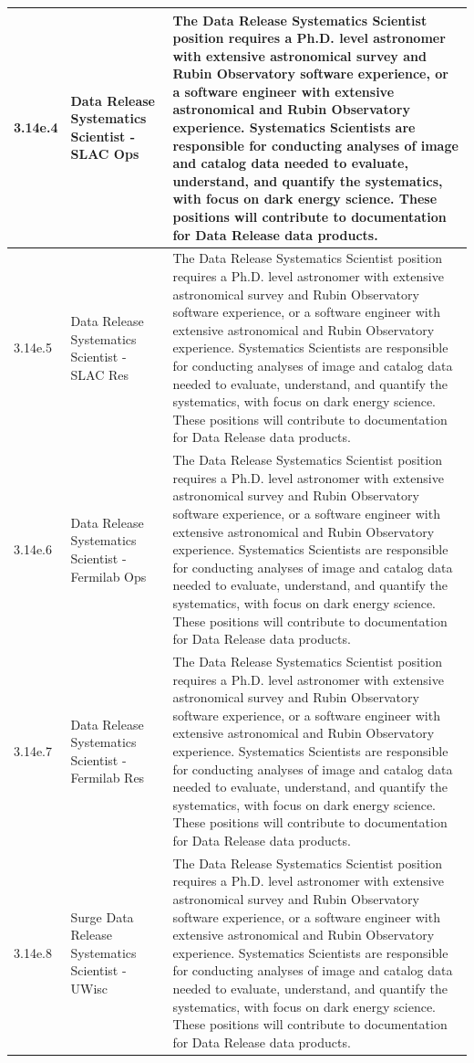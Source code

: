 \begin{longtable} {|p{}|p{}|p{}|}
{3.14e.4}&{Data Release Systematics Scientist - SLAC Ops}&{The Data Release Systematics Scientist position requires a Ph.D. level astronomer with extensive astronomical survey and Rubin Observatory software experience, or a software engineer with extensive astronomical and Rubin Observatory experience. Systematics Scientists are responsible for conducting analyses of image and catalog data needed to evaluate, understand, and quantify the systematics, with focus on dark energy science. These positions will contribute to documentation for Data Release data products. } \\ \hline
{3.14e.5}&{Data Release Systematics Scientist - SLAC Res}&{The Data Release Systematics Scientist position requires a Ph.D. level astronomer with extensive astronomical survey and Rubin Observatory software experience, or a software engineer with extensive astronomical and Rubin Observatory experience. Systematics Scientists are responsible for conducting analyses of image and catalog data needed to evaluate, understand, and quantify the systematics, with focus on dark energy science. These positions will contribute to documentation for Data Release data products. } \\ \hline
{3.14e.6}&{Data Release Systematics Scientist - Fermilab Ops}&{The Data Release Systematics Scientist position requires a Ph.D. level astronomer with extensive astronomical survey and Rubin Observatory software experience, or a software engineer with extensive astronomical and Rubin Observatory experience. Systematics Scientists are responsible for conducting analyses of image and catalog data needed to evaluate, understand, and quantify the systematics, with focus on dark energy science. These positions will contribute to documentation for Data Release data products. } \\ \hline
{3.14e.7}&{Data Release Systematics Scientist - Fermilab Res}&{The Data Release Systematics Scientist position requires a Ph.D. level astronomer with extensive astronomical survey and Rubin Observatory software experience, or a software engineer with extensive astronomical and Rubin Observatory experience. Systematics Scientists are responsible for conducting analyses of image and catalog data needed to evaluate, understand, and quantify the systematics, with focus on dark energy science. These positions will contribute to documentation for Data Release data products. } \\ \hline
{3.14e.8}&{Surge Data Release Systematics Scientist - UWisc}&{The Data Release Systematics Scientist position requires a Ph.D. level astronomer with extensive astronomical survey and Rubin Observatory software experience, or a software engineer with extensive astronomical and Rubin Observatory experience. Systematics Scientists are responsible for conducting analyses of image and catalog data needed to evaluate, understand, and quantify the systematics, with focus on dark energy science. These positions will contribute to documentation for Data Release data products. } \\ \hline

\end{longtable}
